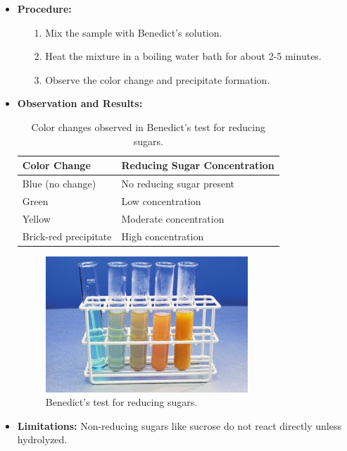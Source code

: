 \begin{itemize}
\begin{itemize}
    \end{itemize}
    \item \textbf{Procedure:}
    \begin{itemize}
        \item[1.] Mix the sample with Benedict's solution.
        \item[2.] Heat the mixture in a boiling water bath for about 2-5 minutes.
        \item[3.] Observe the color change and precipitate formation.
    \end{itemize}
    \item \textbf{Observation and Results:}
    \begin{table}[h!]
        \centering
        \begin{tabular}{|l|l|}
        \hline
        \textbf{Color Change}          & \textbf{Reducing Sugar Concentration} \\ \hline
        Blue (no change)               & No reducing sugar present             \\ \hline
        Green                          & Low concentration                     \\ \hline
        Yellow                         & Moderate concentration                \\ \hline
        Brick-red precipitate          & High concentration                    \\ \hline
        \end{tabular}
        \caption{Color changes observed in Benedict's test for reducing sugars.}
        \label{tab:reducing_sugars}
    \end{table}
    \begin{figure}[H]
        \centering
        \includegraphics[scale=1]{Biology/1A/Images/1A-2-5.bmp}
        \caption{Benedict's test for reducing sugars.}
    \end{figure}
    \item \textbf{Limitations:} Non-reducing sugars like sucrose do not react directly unless hydrolyzed.
\end{itemize}